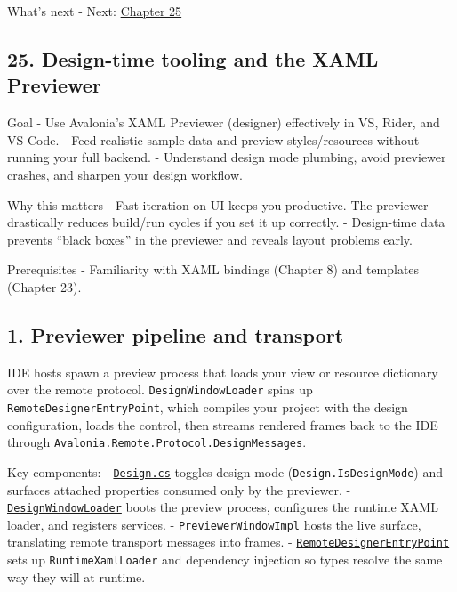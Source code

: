 What's next - Next: \href{Chapter25.md}{Chapter 25}

\newpage

\subsection{25. Design-time tooling and the XAML
Previewer}\label{design-time-tooling-and-the-xaml-previewer}

Goal - Use Avalonia's XAML Previewer (designer) effectively in VS,
Rider, and VS Code. - Feed realistic sample data and preview
styles/resources without running your full backend. - Understand design
mode plumbing, avoid previewer crashes, and sharpen your design
workflow.

Why this matters - Fast iteration on UI keeps you productive. The
previewer drastically reduces build/run cycles if you set it up
correctly. - Design-time data prevents ``black boxes'' in the previewer
and reveals layout problems early.

Prerequisites - Familiarity with XAML bindings (Chapter 8) and templates
(Chapter 23).

\subsection{1. Previewer pipeline and
transport}\label{previewer-pipeline-and-transport}

IDE hosts spawn a preview process that loads your view or resource
dictionary over the remote protocol.
\passthrough{\lstinline!DesignWindowLoader!} spins up
\passthrough{\lstinline!RemoteDesignerEntryPoint!}, which compiles your
project with the design configuration, loads the control, then streams
rendered frames back to the IDE through
\passthrough{\lstinline!Avalonia.Remote.Protocol.DesignMessages!}.

Key components: -
\href{https://github.com/AvaloniaUI/Avalonia/blob/master/src/Avalonia.Controls/Design.cs}{\passthrough{\lstinline!Design.cs!}}
toggles design mode (\passthrough{\lstinline!Design.IsDesignMode!}) and
surfaces attached properties consumed only by the previewer. -
\href{https://github.com/AvaloniaUI/Avalonia/blob/master/src/Avalonia.DesignerSupport/DesignWindowLoader.cs}{\passthrough{\lstinline!DesignWindowLoader!}}
boots the preview process, configures the runtime XAML loader, and
registers services. -
\href{https://github.com/AvaloniaUI/Avalonia/blob/master/src/Avalonia.DesignerSupport/PreviewerWindowImpl.cs}{\passthrough{\lstinline!PreviewerWindowImpl!}}
hosts the live surface, translating remote transport messages into
frames. -
\href{https://github.com/AvaloniaUI/Avalonia/blob/master/src/Avalonia.DesignerSupport/Remote/RemoteDesignerEntryPoint.cs}{\passthrough{\lstinline!RemoteDesignerEntryPoint!}}
sets up \passthrough{\lstinline!RuntimeXamlLoader!} and dependency
injection so types resolve the same way they will at runtime.

